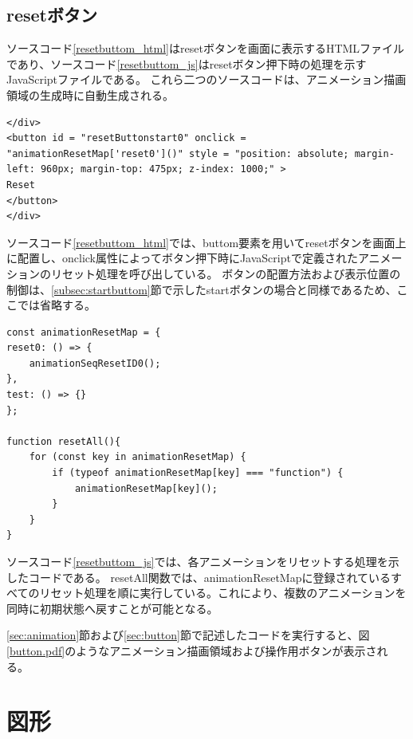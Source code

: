 \subsection{resetボタン}\label{subsec:resetbuttom}
ソースコード\ref{resetbuttom_html}はresetボタンを画面に表示するHTMLファイルであり、ソースコード\ref{resetbuttom_js}はresetボタン押下時の処理を示すJavaScriptファイルである。
これら二つのソースコードは、アニメーション描画領域の生成時に自動生成される。
 \begin{lstlisting}[caption={resetボタン（HTMLファイル）},label={resetbuttom_html},breaklines=true,breakatwhitespace=false]
</div>
<button id = "resetButtonstart0" onclick = "animationResetMap['reset0']()" style = "position: absolute; margin-left: 960px; margin-top: 475px; z-index: 1000;" >
Reset
</button>
</div>
\end{lstlisting}
ソースコード\ref{resetbuttom_html}では、buttom要素を用いてresetボタンを画面上に配置し、onclick属性によってボタン押下時にJavaScriptで定義されたアニメーションのリセット処理を呼び出している。
ボタンの配置方法および表示位置の制御は、\ref{subsec:startbuttom}節で示したstartボタンの場合と同様であるため、ここでは省略する。
 \begin{lstlisting}[caption={resetボタン（JavaScriptファイル）},label={resetbuttom_js},breaklines=true,breakatwhitespace=false]
const animationResetMap = {
reset0: () => {
    animationSeqResetID0();
},
test: () => {}
};

function resetAll(){
    for (const key in animationResetMap) {
        if (typeof animationResetMap[key] === "function") {
            animationResetMap[key]();
        }
    }
}
\end{lstlisting}
ソースコード\ref{resetbuttom_js}では、各アニメーションをリセットする処理を示したコードである。
resetAll関数では、animationResetMapに登録されているすべてのリセット処理を順に実行している。これにより、複数のアニメーションを同時に初期状態へ戻すことが可能となる。
\par
{}
\ref{sec:animation}節および\ref{sec:button}節で記述したコードを実行すると、図\ref{button.pdf}のようなアニメーション描画領域および操作用ボタンが表示される。

\section{図形}
